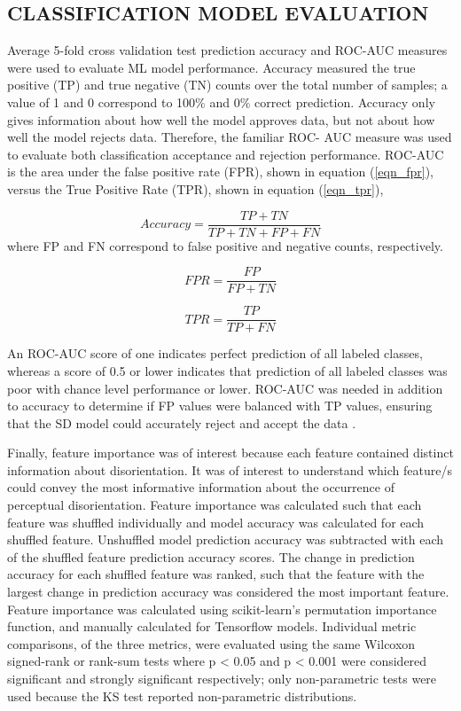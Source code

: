\documentclass{ieeeaccess}
\begin{document}
\subsection{CLASSIFICATION MODEL EVALUATION}
Average 5-fold cross validation test prediction accuracy and ROC-AUC measures were used to evaluate ML model performance. Accuracy measured the true positive (TP) and true negative (TN) counts over the total number of samples; a value of 1 and 0 correspond to 100\% and 0\% correct prediction. Accuracy only gives information about how well the model approves data, but not about how well the model rejects data. Therefore, the familiar ROC- AUC measure was used to evaluate both classification acceptance and rejection performance. ROC-AUC is the area under the false positive rate (FPR), shown in equation (\ref{eqn_fpr}), versus the True Positive Rate (TPR), shown in equation (\ref{eqn_tpr}),

\begin{equation}
Accuracy = \frac{TP+TN}{TP+TN+FP+FN}
\label{eqn_accuracy}
\end{equation}
where FP and FN correspond to false positive and negative counts, respectively. 

\begin{equation}
FPR = \frac{FP}{FP+TN}
\label{eqn_fpr}
\end{equation}

\begin{equation}
TPR = \frac{TP}{TP+FN}
\label{eqn_tpr}
\end{equation}

\noindent An ROC-AUC score of one indicates perfect prediction of all labeled classes, whereas a score of 0.5 or lower indicates that prediction of all labeled classes was poor with chance level performance or lower. ROC-AUC was needed in addition to accuracy to determine if FP values were balanced with TP values, ensuring that the SD model could accurately reject and accept the data \cite{Burkov_2019_ML}.

\indent Finally, feature importance was of interest because each feature contained distinct information about disorientation. It was of interest to understand which feature/s could convey the most informative information about the occurrence of perceptual disorientation. Feature importance was calculated such that each feature was shuffled individually and model accuracy was calculated for each shuffled feature. Unshuffled model prediction accuracy was subtracted with each of the shuffled feature prediction accuracy scores. The change in prediction accuracy for each shuffled feature was ranked, such that the feature with the largest change in prediction accuracy was considered the most important feature. Feature importance was calculated using scikit-learn's permutation importance function, and manually calculated for Tensorflow models. Individual metric comparisons, of the three metrics, were evaluated using the same Wilcoxon signed-rank or rank-sum tests where p < 0.05 and p < 0.001 were considered significant and strongly significant respectively; only non-parametric tests were used because the KS test reported non-parametric distributions.
\end{document}
